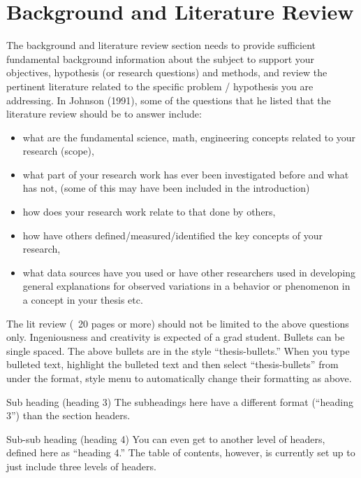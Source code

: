 \chapter{Background and Literature Review} \label{chapterBackground}


The background and literature review section needs to provide sufficient fundamental background information about the subject to support your objectives, hypothesis (or research questions) and methods, and review the pertinent literature related to the specific problem / hypothesis you are addressing. In Johnson (1991), some of the questions that he listed that the literature review should be to answer include: 

\begin{itemize}  
	\item what are the fundamental science, math, engineering concepts related to your research (scope),
	\item what part of your research work has ever been investigated before and what has not, (some of this may have been included in the introduction)
	\item how does your research work relate to that done by others, 
	\item how have others defined/measured/identified the key concepts of your research, 
	\item what data sources have you used or have other researchers used in developing general explanations for observed variations in a behavior or phenomenon in a concept in your thesis etc.  
\end{itemize}

The lit review (~20 pages or more) should not be limited to the above questions only. Ingeniousness and creativity is expected of a grad student.
Bullets can be single spaced.  The above bullets are in the style “thesis-bullets.”  When you type bulleted text, highlight the bulleted text and then select “thesis-bullets” from under the format, style menu to automatically change their formatting as above.



Sub heading (heading 3)
The subheadings here have a different format (“heading 3”) than the section headers.

Sub-sub heading (heading 4)
You can even get to another level of headers, defined here as “heading 4.”  The table of contents, however, is currently set up to just include three levels of headers.

